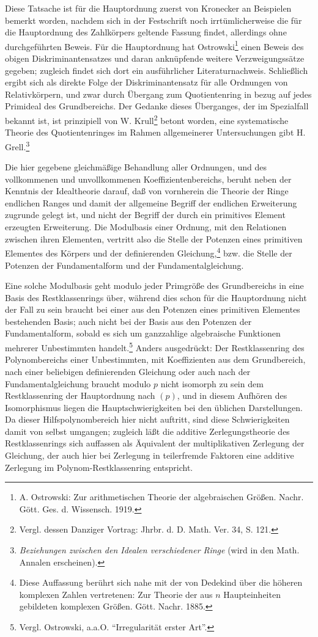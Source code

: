 \documentclass[11pt]{article}
\begin{document}
Diese Tatsache ist für die Hauptordnung zuerst von Kronecker an Beispielen bemerkt worden, nachdem sich in der Festschrift noch irrtümlicherweise die für die Hauptordnung des Zahlkörpers geltende Fassung findet, allerdings ohne durchgeführten Beweis. Für die Hauptordnung hat Ostrowski\footnote{A. Ostrowski: Zur arithmetischen Theorie der algebraischen Größen. Nachr. Gött. Ges. d. Wissensch. 1919.} einen Beweis des obigen Diskriminantensatzes und daran anknüpfende weitere Verzweigungssätze gegeben; zugleich findet sich dort ein ausführlicher Literaturnachweis. Schließlich ergibt sich als direkte Folge der Diskriminantensatz für alle Ordnungen von Relativkörpern, und zwar durch Übergang zum Quotientenring in bezug auf jedes Primideal des Grundbereichs. Der Gedanke dieses Überganges, der im Spezialfall bekannt ist, ist prinzipiell von W. Krull\footnote{Vergl. dessen Danziger Vortrag: Jhrbr. d. D. Math. Ver. 34, S. 121.} betont worden, eine systematische Theorie des Quotientenringes im Rahmen allgemeinerer Untersuchungen gibt H. Grell.\footnote{\emph{Beziehungen zwischen den Idealen verschiedener Ringe} (wird in den Math. Annalen erscheinen).}

Die hier gegebene gleichmäßige Behandlung aller Ordnungen, und des vollkommenen und unvollkommenen Koeffizientenbereichs, beruht neben der Kenntnis der Idealtheorie darauf, daß von vornherein die Theorie der Ringe endlichen Ranges und damit der allgemeine Begriff der endlichen Erweiterung zugrunde gelegt ist, und nicht der Begriff der durch ein primitives Element erzeugten Erweiterung. Die Modulbasis einer Ordnung, mit den Relationen zwischen ihren Elementen, vertritt also die Stelle der Potenzen eines primitiven Elementes des Körpers und der definierenden Gleichung,\footnote{Diese Auffassung berührt sich nahe mit der von Dedekind über die höheren komplexen Zahlen vertretenen: Zur Theorie der aus $n$ Haupteinheiten gebildeten komplexen Größen. Gött. Nachr. 1885.} bzw. die Stelle der Potenzen der Fundamentalform und der Fundamentalgleichung.

Eine solche Modulbasis geht modulo jeder Primgröße des Grundbereichs in eine Basis des Restklassenrings über, während dies schon für die Hauptordnung nicht der Fall zu sein braucht bei einer aus den Potenzen eines primitiven Elementes bestehenden Basis; auch nicht bei der Basis aus den Potenzen der Fundamentalform, sobald es sich um ganzzahlige algebraische Funktionen mehrerer Unbestimmten handelt.\footnote{Vergl. Ostrowski, a.a.O. ``Irregularität erster Art''.} Anders ausgedrückt: Der Restklassenring des Polynombereichs einer Unbestimmten, mit Koeffizienten aus dem Grundbereich, nach einer beliebigen definierenden Gleichung oder auch nach der Fundamentalgleichung braucht modulo $p$ nicht isomorph zu sein dem Restklassenring der Hauptordnung nach $(p)$, und in diesem Aufhören des Isomorphismus liegen die Hauptschwierigkeiten bei den üblichen Darstellungen. Da dieser Hilfspolynombereich hier nicht auftritt, sind diese Schwierigkeiten damit von selbst umgangen; zugleich läßt die additive Zerlegungstheorie des Restklassenrings sich auffassen als Äquivalent der multiplikativen Zerlegung der Gleichung, der auch hier bei Zerlegung in teilerfremde Faktoren eine additive Zerlegung im Polynom-Restklassenring entspricht.
\end{document}
